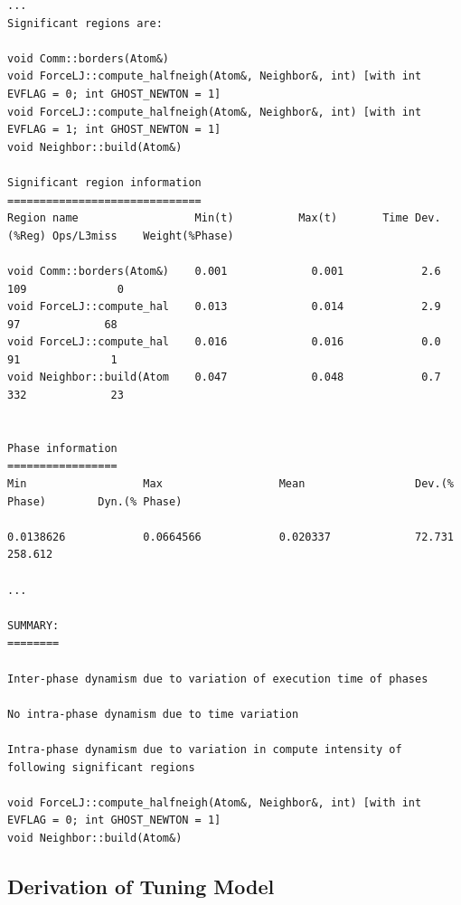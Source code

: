 \begin{lstlisting}[caption={Summary of Application Pre-analysis},label=lst:minimd_dynamism_summary]
...
Significant regions are:

void Comm::borders(Atom&)
void ForceLJ::compute_halfneigh(Atom&, Neighbor&, int) [with int EVFLAG = 0; int GHOST_NEWTON = 1]
void ForceLJ::compute_halfneigh(Atom&, Neighbor&, int) [with int EVFLAG = 1; int GHOST_NEWTON = 1]
void Neighbor::build(Atom&)

Significant region information
==============================
Region name                  Min(t)          Max(t)       Time Dev.(%Reg) Ops/L3miss    Weight(%Phase)

void Comm::borders(Atom&)    0.001             0.001            2.6           109              0
void ForceLJ::compute_hal    0.013             0.014            2.9            97             68
void ForceLJ::compute_hal    0.016             0.016            0.0            91              1
void Neighbor::build(Atom    0.047             0.048            0.7           332             23


Phase information
=================
Min                  Max                  Mean                 Dev.(% Phase)        Dyn.(% Phase)

0.0138626            0.0664566            0.020337             72.731               258.612

...

SUMMARY:
========

Inter-phase dynamism due to variation of execution time of phases

No intra-phase dynamism due to time variation

Intra-phase dynamism due to variation in compute intensity of following significant regions

void ForceLJ::compute_halfneigh(Atom&, Neighbor&, int) [with int EVFLAG = 0; int GHOST_NEWTON = 1]
void Neighbor::build(Atom&)
\end{lstlisting}

\subsection{Derivation of Tuning Model}
\label{sec:tuning_model_generation}


